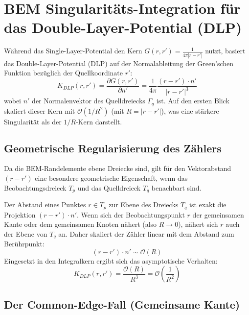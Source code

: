 \documentclass[11pt,a4paper]{article}
\begin{document}
\clearpage
\section{BEM Singularitäts-Integration für das Double-Layer-Potential (DLP)}

Während das Single-Layer-Potential den Kern $G(r, r') = \frac{1}{4\pi |r - r'|}$ nutzt, basiert das Double-Layer-Potential (DLP) auf der Normalableitung der Green'schen Funktion bezüglich der Quellkoordinate $r'$:
\begin{equation}
    K_{DLP}(r, r') = \frac{\partial G(r, r')}{\partial n'} = \frac{1}{4\pi} \frac{(r - r') \cdot n'}{|r - r'|^3}
\end{equation}
wobei $n'$ der Normalenvektor des Quelldreiecks $\Gamma_q$ ist. Auf den ersten Blick skaliert dieser Kern mit $\mathcal{O}(1/R^2)$ (mit $R = |r - r'|$), was eine stärkere Singularität als der $1/R$-Kern darstellt. 

\subsection{Geometrische Regularisierung des Zählers}

Da die BEM-Randelemente ebene Dreiecke sind, gilt für den Vektorabstand $(r - r')$ eine besondere geometrische Eigenschaft, wenn das Beobachtungsdreieck $T_p$ und das Quelldreieck $T_q$ benachbart sind. 

Der Abstand eines Punktes $r \in T_p$ zur Ebene des Dreiecks $T_q$ ist exakt die Projektion $(r - r') \cdot n'$. 
Wenn sich der Beobachtungspunkt $r$ der gemeinsamen Kante oder dem gemeinsamen Knoten nähert (also $R \to 0$), nähert sich $r$ auch der Ebene von $T_q$ an. Daher skaliert der Zähler linear mit dem Abstand zum Berührpunkt:
\begin{equation}
    (r - r') \cdot n' \sim \mathcal{O}(R)
\end{equation}
Eingesetzt in den Integralkern ergibt sich das asymptotische Verhalten:
\begin{equation}
    K_{DLP}(r, r') = \frac{\mathcal{O}(R)}{R^3} = \mathcal{O}\left(\frac{1}{R^2}\right)
\end{equation}

\subsection{Der Common-Edge-Fall (Gemeinsame Kante)}
\end{document}
